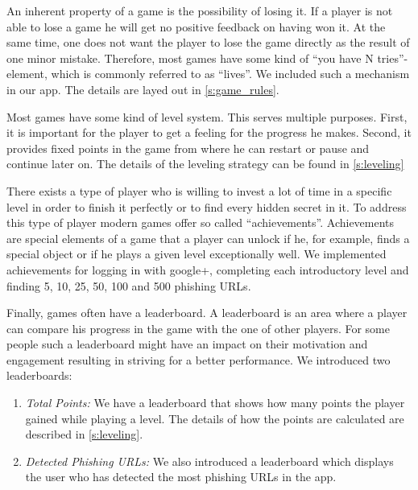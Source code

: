 \begin{description}[leftmargin=0cm]
\item[Lives:] An inherent property of a game is the possibility of losing it.
If a player is not able to lose a game he will get no positive feedback on having won it.
At the same time, one does not want the player to lose the game directly as the result of one minor mistake.
Therefore, most games have some kind of ``you have N tries''-element, which is commonly referred to as ``lives''.
We included such a mechanism in our app.
The details are layed out in \autoref{s:game_rules}.
\item[Levels:] Most games have some kind of level system.
This serves multiple purposes.
First, it is important for the player to get a feeling for the progress he makes.
Second, it provides fixed points in the game from where he can restart or pause and continue later on.
The details of the leveling strategy can be found in \autoref{s:leveling}

\item[Achievements:] There exists a type of player who is willing to invest a lot of time in a specific level in order to finish it perfectly or to find every hidden secret in it.
To address this type of player modern games offer so called ``achievements''.
Achievements are special elements of a game that a player can unlock if he, for example, finds a special object or if he plays a given level exceptionally well. 
We implemented achievements for logging in with google+, completing each introductory level and finding 5, 10, 25, 50, 100 and 500 phishing URLs. 

\item[Leaderboards:] Finally, games often have a leaderboard.
A leaderboard is an area where a player can compare his progress in the game with the one of other players.
For some people such a leaderboard might have an impact on their motivation and engagement resulting in striving for a better performance.
We introduced two leaderboards:
\begin{enumerate}
\item \textit{Total Points:} We have a leaderboard that shows how many points the player gained while playing a level. The details of how the points are calculated are described in \autoref{s:leveling}.
\item \textit{Detected Phishing URLs:} We also introduced a leaderboard which displays the user who has detected the most phishing URLs in the app. 
\end{enumerate}

\end{description}

